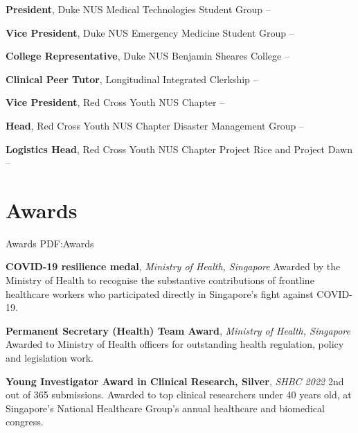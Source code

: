 \documentclass[letterpaper,10pt,oneside]{article}
\begin{document}
\begin{body}

\textbf{President}, Duke NUS Medical Technologies Student Group
\hfill
{} --  
\GapNoBreak

\textbf{Vice President}, Duke NUS Emergency Medicine Student Group
\hfill
{} --  
\GapNoBreak

\textbf{College Representative}, Duke NUS Benjamin Sheares College
\hfill
{} --  
\GapNoBreak

\textbf{Clinical Peer Tutor}, Longitudinal Integrated Clerkship
\hfill
{} --  
\GapNoBreak

\textbf{Vice President}, Red Cross Youth NUS Chapter
\hfill
{} --  
\GapNoBreak

\textbf{Head}, Red Cross Youth NUS Chapter Disaster Management Group
\hfill
{} --  
\GapNoBreak

\textbf{Logistics Head}, Red Cross Youth NUS Chapter Project Rice and Project Dawn
\hfill
{} --  
\GapNoBreak


\section
{Awards}
{Awards}
{PDF:Awards}

\textbf{COVID-19 resilience medal}, \textit{Ministry of Health, Singapore}
\hfill{}
\GapNoBreak
\BulletItem
Awarded by the Ministry of Health to recognise the substantive contributions of frontline healthcare workers who participated directly in Singapore’s fight against COVID-19.
\GapNoBreak
\medskip

\textbf{Permanent Secretary (Health) Team Award}, \textit{Ministry of Health, Singapore}
\hfill{}
\GapNoBreak
\BulletItem
Awarded to Ministry of Health officers for outstanding health regulation, policy and legislation work.
\GapNoBreak
\medskip

\textbf{Young Investigator Award in Clinical Research, Silver}, \textit{SHBC 2022}
\hfill{}
\GapNoBreak
\BulletItem
2nd out of 365 submissions. Awarded to top clinical researchers under 40 years old, at Singapore's National Healthcare Group's annual healthcare and biomedical congress. 
\GapNoBreak
\medskip


\end{body}
\end{document}
